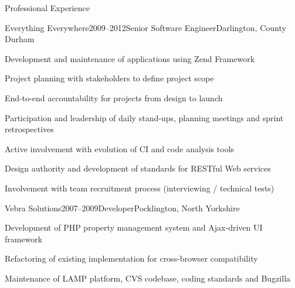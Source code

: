 \documentclass{cv}
\begin{document}
\begin{rSection}{Professional Experience}

\begin{rSubsection}{Everything Everywhere}{2009--2012}{Senior Software Engineer}{Darlington, County Durham}
\item Development and maintenance of applications using Zend Framework
\item Project planning with stakeholders to define project scope
\item End-to-end accountability for projects from design to launch
\item Participation and leadership of daily stand-ups, planning meetings and sprint retrospectives
\item Active involvement with evolution of CI and code analysis tools
\item Design authority and development of standards for RESTful Web services
\item Involvement with team recruitment process (interviewing / technical tests)
\end{rSubsection}


\begin{rSubsection}{Vebra Solutions}{2007--2009}{Developer}{Pocklington, North Yorkshire}
\item Development of PHP property management system and Ajax-driven UI framework
\item Refactoring of existing implementation for cross-browser compatibility
\item Maintenance of LAMP platform, CVS codebase, coding standards and Bugzilla
\end{rSubsection}

\end{rSection}

\end{document}
